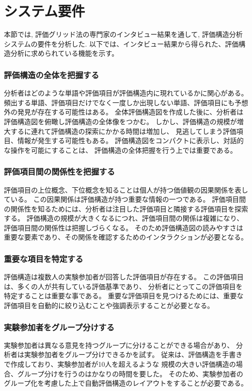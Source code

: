 \documentclass[syuuron]{kuee}
\begin{document}
	\section{システム要件}
		本節では, 評価グリッド法の専門家のインタビュー結果\cite{hak1}を通して, 評価構造分析システムの要件を分析した. 
		以下では、インタビュー結果から得られた、評価構造分析に求められている機能を示す。
		\subsubsection{評価構造の全体を把握する}
			分析者はどのような単語や評価項目が評価構造内に現れているかに関心がある。
			頻出する単語、評価項目だけでなく一度しか出現しない単語、評価項目にも予想外の発見が存在する可能性はある。
			全体評価構造図を作成した後に、分析者は評価構造図を俯瞰し評価構造の全体像をつかむ。
			しかし、評価構造の規模が増大するに連れて評価構造の探索にかかる時間は増加し、
			見逃してしまう評価項目、情報が発生する可能性もある。
			評価構造図をコンパクトに表示し、対話的な操作を可能にすることは、
			評価構造の全体把握を行う上では重要である。
		\subsubsection{評価項目間の関係性を把握する}
			評価項目の上位概念、下位概念を知ることは個人が持つ価値観の因果関係を表している。
			この因果関係は評価構造が持つ重要な情報の一つである。
			評価項目間の関係性を知るためには、分析者は注目した評価項目と隣接する評価項目を探索する。
			評価構造の規模が大きくなるにつれ、評価項目間の関係は複雑になり、評価項目間の関係性は把握しづらくなる。
			そのため評価構造図の読みやすさは重要な要素であり、その関係を確認するためのインタラクションが必要となる。
		\subsubsection{重要な項目を特定する}
			評価構造は複数人の実験参加者が回答した評価項目が存在する。
			この評価項目は、多くの人が共有している評価基準であり、
			分析者にとってこの評価項目を特定することは重要な事である。
			重要な評価項目を見つけるためには、重要な評価項目を自動的に絞り込むことや強調表示することが必要となる。
		\subsubsection{実験参加者をグループ分けする}
			実験参加者は異なる意見を持つグループに分けることができる場合があり、
			分析者は実験参加者をグループ分けできるかを試す。
			従来は、評価構造を手書きで作成しており、実験参加者が10人を超えるような
			規模の大きい評価構造の場合、グループ分けを行うのはかなりの時間を要した。
			そのため、実験参加者のグループ化を考慮した上で自動評価構造のレイアウトをすることが必要である。
\end{document}

